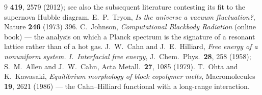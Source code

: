 \documentclass[11pt]{article}
\begin{document}
\begin{thebibliography}{9}
\textbf{419}, 2579 (2012); see also the subsequent literature contesting its fit to the supernova Hubble diagram.
 E.\ P.\ Tryon, \emph{Is the universe a vacuum fluctuation?}, Nature \textbf{246} (1973) 396.
 C.\ Johnson, \emph{Computational Blackbody Radiation} (online book) --- the analysis on which
a Planck spectrum is the signature of a resonant lattice rather than of a hot gas.
 J.\ W.\ Cahn and J.\ E.\ Hilliard, \emph{Free energy of a nonuniform system. I.\ Interfacial
free energy}, J.\ Chem.\ Phys.\ \textbf{28}, 258 (1958); S.\ M.\ Allen and J.\ W.\ Cahn, Acta Metall.\ \textbf{27},
1085 (1979).
 T.\ Ohta and K.\ Kawasaki, \emph{Equilibrium morphology of block copolymer melts},
Macromolecules \textbf{19}, 2621 (1986) --- the Cahn--Hilliard functional with a long-range interaction.
\end{thebibliography}
\end{document}
